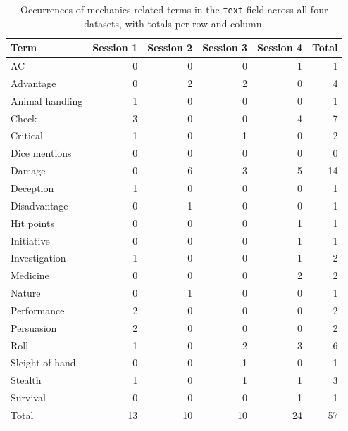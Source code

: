 \begin{table}[h]
\centering
\begin{tabular}{l r r r r r}
\hline
\textbf{Term} & \textbf{Session 1} & \textbf{Session 2} & \textbf{Session 3} & \textbf{Session 4} & \textbf{Total} \\
\hline
AC & 0 & 0 & 0 & 1 & 1 \\
Advantage & 0 & 2 & 2 & 0 & 4 \\
Animal handling & 1 & 0 & 0 & 0 & 1 \\
Check & 3 & 0 & 0 & 4 & 7 \\
Critical & 1 & 0 & 1 & 0 & 2 \\
Dice mentions & 0 & 0 & 0 & 0 & 0 \\
Damage & 0 & 6 & 3 & 5 & 14 \\
Deception & 1 & 0 & 0 & 0 & 1 \\
Disadvantage & 0 & 1 & 0 & 0 & 1 \\
Hit points & 0 & 0 & 0 & 1 & 1 \\
Initiative & 0 & 0 & 0 & 1 & 1 \\
Investigation & 1 & 0 & 0 & 1 & 2 \\
Medicine & 0 & 0 & 0 & 2 & 2 \\
Nature & 0 & 1 & 0 & 0 & 1 \\
Performance & 2 & 0 & 0 & 0 & 2 \\
Persuasion & 2 & 0 & 0 & 0 & 2 \\
Roll & 1 & 0 & 2 & 3 & 6 \\
Sleight of hand & 0 & 0 & 1 & 0 & 1 \\
Stealth & 1 & 0 & 1 & 1 & 3 \\
Survival & 0 & 0 & 0 & 1 & 1 \\
\hline
Total & 13 & 10 & 10 & 24 & 57 \\
\hline
\end{tabular}
\caption{Occurrences of mechanics-related terms in the \texttt{text} field across all four datasets, with totals per row and column.}
\label{tab:leakage-all-sessions}
\end{table}

